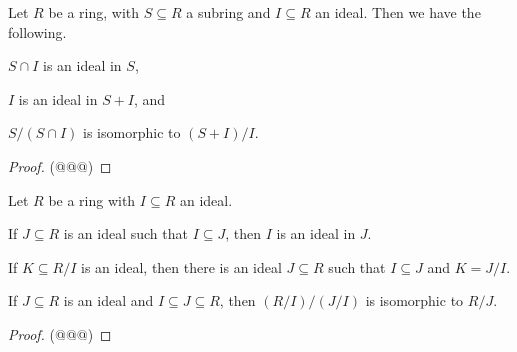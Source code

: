 \begin{prop}
Let \(R\) be a ring, with \(S \subseteq R\) a subring and \(I \subseteq R\) an ideal. Then we have the following.
\begin{proplist}
\item \(S \cap I\) is an ideal in \(S\),
\item \(I\) is an ideal in \(S + I\), and
\item \(S/(S \cap I)\) is isomorphic to \((S+I)/I\).
\end{proplist}
\end{prop}

\begin{proof}
(@@@)
\end{proof}

\begin{prop}
Let \(R\) be a ring with \(I \subseteq R\) an ideal.
\begin{proplist}
\item If \(J \subseteq R\) is an ideal such that \(I \subseteq J\), then \(I\) is an ideal in \(J\).
\item If \(K \subseteq R/I\) is an ideal, then there is an ideal \(J \subseteq R\) such that \(I \subseteq J\) and \(K = J/I\).
\item If \(J \subseteq R\) is an ideal and \(I \subseteq J \subseteq R\), then \((R/I)/(J/I)\) is isomorphic to \(R/J\).
\end{proplist}
\end{prop}

\begin{proof}
(@@@)
\end{proof}
